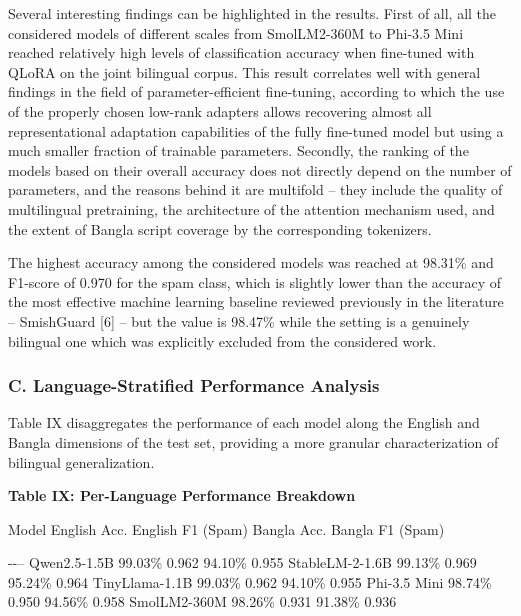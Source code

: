 Several interesting findings can be highlighted in the results. First of
all, all the considered models of different scales from SmolLM2-360M to
Phi-3.5 Mini reached relatively high levels of classification accuracy
when fine-tuned with QLoRA on the joint bilingual corpus. This result
correlates well with general findings in the field of
parameter-efficient fine-tuning, according to which the use of the
properly chosen low-rank adapters allows recovering almost all
representational adaptation capabilities of the fully fine-tuned model
but using a much smaller fraction of trainable parameters. Secondly, the
ranking of the models based on their overall accuracy does not directly
depend on the number of parameters, and the reasons behind it are
multifold -- they include the quality of multilingual pretraining, the
architecture of the attention mechanism used, and the extent of Bangla
script coverage by the corresponding tokenizers.

The highest accuracy among the considered models was reached at 98.31\%
and F1-score of 0.970 for the spam class, which is slightly lower than
the accuracy of the most effective machine learning baseline reviewed
previously in the literature -- SmishGuard {[}6{]} -- but the value is
98.47\% while the setting is a genuinely bilingual one which was
explicitly excluded from the considered work.

\subsubsection{C. Language-Stratified Performance
Analysis}\label{c.-language-stratified-performance-analysis}

Table IX disaggregates the performance of each model along the English
and Bangla dimensions of the test set, providing a more granular
characterization of bilingual generalization.

\textbf{Table IX: Per-Language Performance Breakdown}

Model \textbar{} English Acc. \textbar{} English F1 (Spam) \textbar{}
Bangla Acc. \textbar{} Bangla F1 (Spam) \textbar{}

\textbar-\textbar-\textbar\textbar\textbar--\textbar{} \textbar{}
Qwen2.5-1.5B \textbar{} 99.03\% \textbar{} 0.962 \textbar{} 94.10\%
\textbar{} 0.955 \textbar{} \textbar{} StableLM-2-1.6B \textbar{}
99.13\% \textbar{} 0.969 \textbar{} 95.24\% \textbar{} 0.964 \textbar{}
\textbar{} TinyLlama-1.1B \textbar{} 99.03\% \textbar{} 0.962 \textbar{}
94.10\% \textbar{} 0.955 \textbar{} \textbar{} Phi-3.5 Mini \textbar{}
98.74\% \textbar{} 0.950 \textbar{} 94.56\% \textbar{} 0.958 \textbar{}
\textbar{} SmolLM2-360M \textbar{} 98.26\% \textbar{} 0.931 \textbar{}
91.38\% \textbar{} 0.936 \textbar{}

